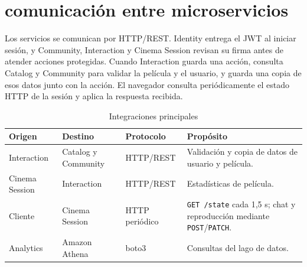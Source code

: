 ﻿\chapter{comunicación entre microservicios}
Los servicios se comunican por HTTP/REST. Identity entrega el JWT al iniciar sesión, y Community, Interaction y Cinema Session revisan su firma antes de atender acciones protegidas. Cuando Interaction guarda una acción, consulta Catalog y Community para validar la película y el usuario, y guarda una copia de esos datos junto con la acción. El navegador consulta periódicamente el estado HTTP de la sesión y aplica la respuesta recibida.
\begin{table}[H]\centering\small\caption{Integraciones principales}\begin{tabularx}{\textwidth}{p{}p{}p{}X}\toprule Origen&Destino&Protocolo&Propósito\\\midrule Interaction&Catalog y Community&HTTP/REST&Validación y copia de datos de usuario y película.\\Cinema Session&Interaction&HTTP/REST&Estadísticas de película.\\Cliente&Cinema Session&HTTP periódico&\texttt{GET /state} cada 1,5 s; chat y reproducción mediante \texttt{POST}/\texttt{PATCH}.\\Analytics&Amazon Athena&boto3&Consultas del lago de datos.\\\bottomrule\end{tabularx}\end{table}
